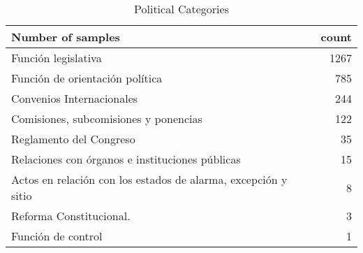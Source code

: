 \begin{table}
\caption{Political Categories}
\label{tab:political_categories}
\begin{tabular}{lr}
\toprule
Number of samples & count \\
\midrule
Función legislativa & 1267 \\
Función de orientación política & 785 \\
Convenios Internacionales & 244 \\
Comisiones, subcomisiones y ponencias & 122 \\
Reglamento del Congreso & 35 \\
Relaciones con órganos e instituciones públicas & 15 \\
Actos en relación con los estados de alarma, excepción y sitio & 8 \\
Reforma Constitucional. & 3 \\
Función de control & 1 \\
\bottomrule
\end{tabular}
\end{table}
